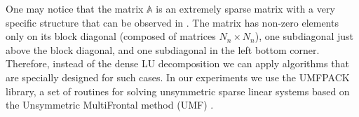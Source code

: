 One may notice that the matrix $\mathbb{A}$ is an extremely sparse matrix with a very specific structure that can be observed in . The matrix has non-zero elements only on its block diagonal (composed of matrices $N_n \times N_n$), one subdiagonal just above the block diagonal, and one subdiagonal in the left bottom corner. Therefore, instead of the dense LU decomposition we can apply algorithms that are specially designed for such cases.
In our experiments we use the UMFPACK library, a set of routines for solving unsymmetric sparse linear systems based on the Unsymmetric MultiFrontal method (UMF) \cite{umfpack2004}.
